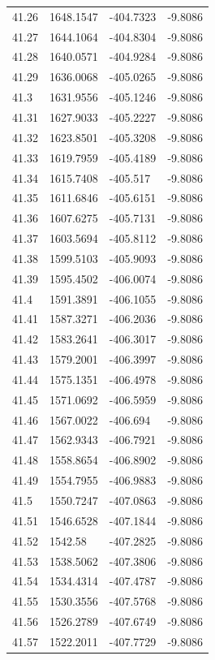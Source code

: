 \begin{table}[H]
\begin{tabular}{llll}
41.26 & 1648.1547 & -404.7323 & -9.8086 \\
41.27 & 1644.1064 & -404.8304 & -9.8086 \\
41.28 & 1640.0571 & -404.9284 & -9.8086 \\
41.29 & 1636.0068 & -405.0265 & -9.8086 \\
41.3 & 1631.9556 & -405.1246 & -9.8086 \\
41.31 & 1627.9033 & -405.2227 & -9.8086 \\
41.32 & 1623.8501 & -405.3208 & -9.8086 \\
41.33 & 1619.7959 & -405.4189 & -9.8086 \\
41.34 & 1615.7408 & -405.517 & -9.8086 \\
41.35 & 1611.6846 & -405.6151 & -9.8086 \\
41.36 & 1607.6275 & -405.7131 & -9.8086 \\
41.37 & 1603.5694 & -405.8112 & -9.8086 \\
41.38 & 1599.5103 & -405.9093 & -9.8086 \\
41.39 & 1595.4502 & -406.0074 & -9.8086 \\
41.4 & 1591.3891 & -406.1055 & -9.8086 \\
41.41 & 1587.3271 & -406.2036 & -9.8086 \\
41.42 & 1583.2641 & -406.3017 & -9.8086 \\
41.43 & 1579.2001 & -406.3997 & -9.8086 \\
41.44 & 1575.1351 & -406.4978 & -9.8086 \\
41.45 & 1571.0692 & -406.5959 & -9.8086 \\
41.46 & 1567.0022 & -406.694 & -9.8086 \\
41.47 & 1562.9343 & -406.7921 & -9.8086 \\
41.48 & 1558.8654 & -406.8902 & -9.8086 \\
41.49 & 1554.7955 & -406.9883 & -9.8086 \\
41.5 & 1550.7247 & -407.0863 & -9.8086 \\
41.51 & 1546.6528 & -407.1844 & -9.8086 \\
41.52 & 1542.58 & -407.2825 & -9.8086 \\
41.53 & 1538.5062 & -407.3806 & -9.8086 \\
41.54 & 1534.4314 & -407.4787 & -9.8086 \\
41.55 & 1530.3556 & -407.5768 & -9.8086 \\
41.56 & 1526.2789 & -407.6749 & -9.8086 \\
41.57 & 1522.2011 & -407.7729 & -9.8086 \\

\end{tabular}
\end{table}

